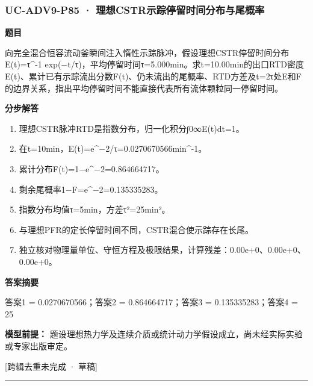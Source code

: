 \documentclass[UTF8,11pt,a4paper]{ctexart}
\begin{document}
\subsubsection*{UC-ADV9-P85 · 理想CSTR示踪停留时间分布与尾概率}
\noindent\textbf{题目}\par
向完全混合恒容流动釜瞬间注入惰性示踪脉冲，假设理想CSTR停留时间分布E(t)=τ\textasciicircum{}-1 exp(−t/τ)，平均停留时间τ=5.000min。求t=10.00min的出口RTD密度E(t)、累计已有示踪流出分数F(t)、仍未流出的尾概率、RTD方差及t=2τ处E和F的边界关系，指出平均停留时间不能直接代表所有流体颗粒同一停留时间。\par
\medskip\noindent\textbf{分步解答}
\begin{enumerate}
\item 理想CSTR脉冲RTD是指数分布，归一化积分∫0∞E(t)dt=1。
\item 在t=10min，E(t)=e\textasciicircum{}−2/τ=0.0270670566min\textasciicircum{}-1。
\item 累计分布F(t)=1−e\textasciicircum{}−2=0.864664717。
\item 剩余尾概率1−F=e\textasciicircum{}−2=0.135335283。
\item 指数分布均值τ=5min，方差τ²=25min²。
\item 与理想PFR的定长停留时间不同，CSTR混合使示踪存在长尾。
\item 独立核对物理量单位、守恒方程及极限结果，计算残差：0.00e+0、0.00e+0、0.00e+0。
\end{enumerate}
\noindent\textbf{答案摘要}\par
答案1 = 0.0270670566；答案2 = 0.864664717；答案3 = 0.135335283；答案4 = 25\par
\noindent\textbf{模型前提：}
题设理想热力学及连续介质或统计动力学假设成立，尚未经实际实验或专家出版审定。\par
\noindent\textcolor{red!65!black}{[跨辑去重未完成 · 草稿]} \par
\medskip\hrule\medskip
{}
\end{document}
